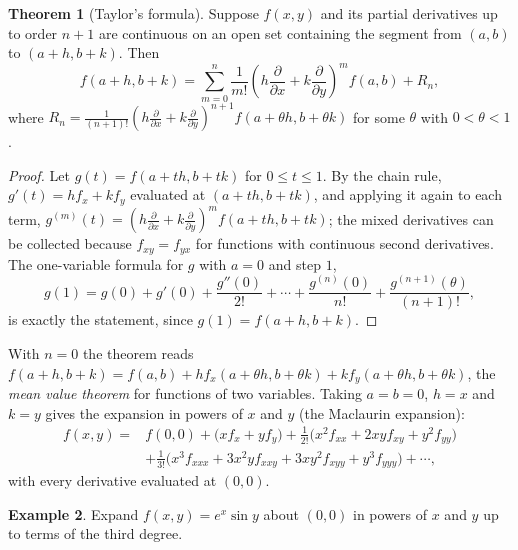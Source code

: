 \documentclass[11pt,a4paper]{article}
\theoremstyle{definition}
\newtheorem{thm}{Theorem}[subsection]
\newtheorem{exa}[thm]{Example}
\begin{document}
\begin{thm}[Taylor's formula]
\label{thm:taylor2}
Suppose $f(x,y)$ and its partial derivatives up to order $n+1$ are continuous on
an open set containing the segment from $(a,b)$ to $(a+h,b+k)$. Then
\[f(a+h,b+k) = \sum_{m=0}^{n}\frac{1}{m!}\left(h\frac{\partial}{\partial x} +
k\frac{\partial}{\partial y}\right)^m f(a,b) + R_n ,\]
where
$R_n = \frac{1}{(n+1)!}\left(h\frac{\partial}{\partial x} +
k\frac{\partial}{\partial y}\right)^{n+1}f(a+\theta h,b+\theta k)$ for some
$\theta$ with $0<\theta<1$.
\end{thm}

\begin{proof}
Let $g(t) = f(a+th,b+tk)$ for $0\leq t\leq 1$. By the chain rule,
$g'(t) = hf_x + kf_y$ evaluated at $(a+th,b+tk)$, and applying it again to each
term, $g^{(m)}(t) = \left(h\frac{\partial}{\partial x} +
k\frac{\partial}{\partial y}\right)^m f(a+th,b+tk)$; the mixed derivatives can be
collected because $f_{xy} = f_{yx}$ for functions with continuous second
derivatives. The one-variable formula for $g$ with $a = 0$ and step $1$,
\[g(1) = g(0) + g'(0) + \frac{g''(0)}{2!} + \cdots + \frac{g^{(n)}(0)}{n!} +
\frac{g^{(n+1)}(\theta)}{(n+1)!},\]
is exactly the statement, since $g(1) = f(a+h,b+k)$.
\end{proof}

With $n = 0$ the theorem reads
$f(a+h,b+k) = f(a,b) + hf_x(a+\theta h, b+\theta k) + kf_y(a+\theta h,b+\theta
k)$, the \emph{mean value theorem} for functions of two variables. Taking
$a = b = 0$, $h = x$ and $k = y$ gives the expansion in powers of $x$ and $y$ (the
Maclaurin expansion):
\begin{align*}
f(x,y) = {} & f(0,0) + \big(xf_x + yf_y\big) + \frac{1}{2!}\big(x^2f_{xx} + 2xyf_{xy} +
y^2f_{yy}\big)\\
& + \frac{1}{3!}\big(x^3f_{xxx} + 3x^2y f_{xxy} + 3xy^2f_{xyy} + y^3f_{yyy}\big)
+\cdots ,
\end{align*}
with every derivative evaluated at $(0,0)$.

\begin{exa}
\label{ex:taylorexpsin}
Expand $f(x,y) = e^x \sin y$ about $(0,0)$ in powers of $x$ and $y$ up to terms of
the third degree.
\end{exa}
\end{document}
